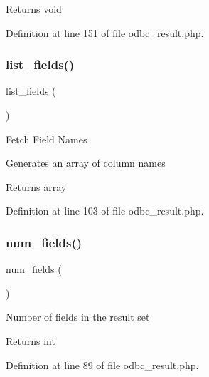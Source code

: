 \begin{DoxyReturn}{Returns}
void 
\end{DoxyReturn}


Definition at line 151 of file odbc\+\_\+result.\+php.

\mbox{\label{class_c_i___d_b__odbc__result_a50b54eb4ea7cfd039740f532988ea776}} 
\subsubsection{\texorpdfstring{list\_fields()}{list\_fields()}}
{\footnotesize\ttfamily list\+\_\+fields (\begin{DoxyParamCaption}{ }\end{DoxyParamCaption})}

Fetch Field Names

Generates an array of column names

\begin{DoxyReturn}{Returns}
array 
\end{DoxyReturn}


Definition at line 103 of file odbc\+\_\+result.\+php.

\mbox{\label{class_c_i___d_b__odbc__result_af831bf363e4d7d661a717a4932af449d}} 
\subsubsection{\texorpdfstring{num\_fields()}{num\_fields()}}
{\footnotesize\ttfamily num\+\_\+fields (\begin{DoxyParamCaption}{ }\end{DoxyParamCaption})}

Number of fields in the result set

\begin{DoxyReturn}{Returns}
int 
\end{DoxyReturn}


Definition at line 89 of file odbc\+\_\+result.\+php.

\mbox{\label{class_c_i___d_b__odbc__result_a218657c303ee499b97710ab0cd2f5d6e}} 

